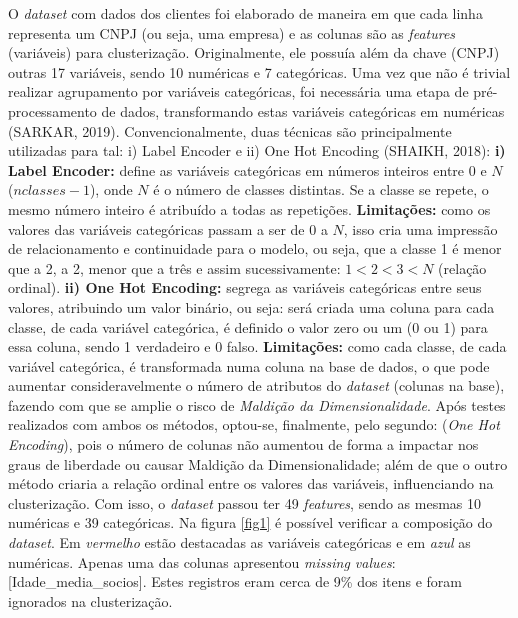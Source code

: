 \documentclass[twocolumn]{rbef}
\newcommand{\1}{\mathbbm{1}}
\begin{document}
O \emph{dataset} com dados dos clientes foi elaborado de maneira em que cada linha representa um CNPJ (ou seja, uma empresa) e as colunas são as \emph{features} (variáveis) para clusterização. Originalmente, ele possuía além da chave (CNPJ) outras 17 variáveis, sendo 10 numéricas e 7 categóricas. Uma vez que não é trivial realizar agrupamento por variáveis categóricas, foi necessária uma etapa de pré-processamento de dados, transformando estas variáveis categóricas em numéricas (SARKAR, 2019)\cite{SARKAR}. Convencionalmente, duas técnicas são principalmente utilizadas para tal: i) Label Encoder e ii) One Hot Encoding (SHAIKH, 2018)\cite{SHAIKH}:\newline
\newline\textbf{i) Label Encoder:} define as variáveis categóricas em números inteiros entre 0 e $N$ ($nclasses - 1$), onde $N$ é o número de classes distintas. Se a classe se repete, o mesmo número inteiro é atribuído a todas as repetições. \textbf{Limitações:} como os valores das variáveis categóricas passam a ser de 0 a $N$, isso cria uma impressão de relacionamento e continuidade para o modelo, ou seja, que a classe 1 é menor que a 2, a 2, menor que a três e assim sucessivamente: $1 < 2 < 3 < N$ (relação ordinal).
\linebreak\textbf{ii) One Hot Encoding:} segrega as variáveis categóricas entre seus valores, atribuindo um valor binário, ou seja: será criada uma coluna para cada classe, de cada variável categórica, é definido o valor zero ou um (0 ou 1) para essa coluna, sendo 1 verdadeiro e 0 falso. \textbf{Limitações:} como cada classe, de cada variável categórica, é transformada numa coluna na base de dados, o que pode aumentar consideravelmente o número de atributos do \emph{dataset} (colunas na base), fazendo com que se amplie o risco de \emph{Maldição da Dimensionalidade}.
\newline\linebreak Após testes realizados com ambos os métodos, optou-se, finalmente, pelo segundo: (\emph{One Hot Encoding}), pois o número de colunas não aumentou de forma a impactar nos graus de liberdade ou causar Maldição da Dimensionalidade; além de que o outro método criaria a relação ordinal entre os valores das variáveis, influenciando na clusterização. Com isso, o \emph{dataset} passou ter 49 \emph{features}, sendo as mesmas 10 numéricas e 39 categóricas. Na figura \ref{fig1} é possível verificar a composição do \emph{dataset}. Em \emph{vermelho} estão destacadas as variáveis categóricas e em \emph{azul} as numéricas. Apenas uma das colunas apresentou \emph{missing values}: [Idade\_media\_socios]. Estes registros eram cerca de 9\% dos itens e foram ignorados na clusterização.
\end{document}
